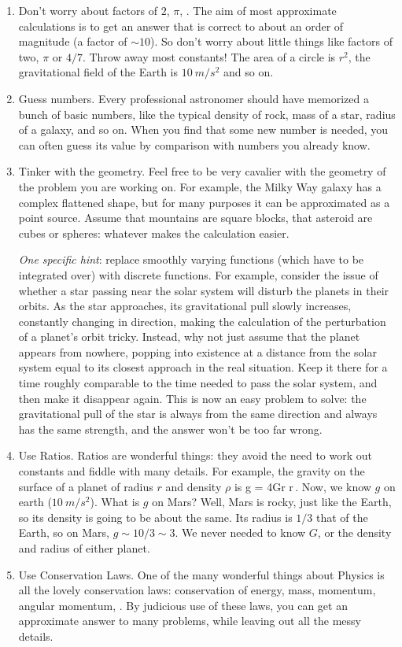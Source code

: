 \begin{enumerate}
\item Don't worry about factors of $2$, $\pi$, \etc. The aim of most approximate calculations is to get an answer that is correct to about an order of magnitude (a factor of $\sim 10$). So don't worry about little things like factors of two, $\pi$ or $4/7$. Throw away most constants! The area of a circle is $r^2$, the gravitational field of the Earth is $\SI{10}{m/s^2}$ and so on.
%
\item Guess numbers. Every professional astronomer should have memorized a bunch of basic numbers, like the typical density of rock, mass of a star, radius of a galaxy, and so on. When you find that some new number is needed, you can often guess its value by comparison with numbers you already know.
%
\item Tinker with the geometry.  Feel free to be very cavalier with the geometry of the problem you are working on. For example, the Milky Way galaxy has a complex flattened shape, but for many purposes it can be approximated as a point source. Assume that mountains are square blocks, that asteroid are cubes or spheres: whatever makes the calculation easier.

\emph{One specific hint}: replace smoothly varying functions (which have to be integrated over) with discrete functions. For example, consider the issue of whether a star passing near the solar system will disturb the planets in their orbits. As the star approaches, its gravitational pull slowly increases, constantly changing in direction, making the calculation of the perturbation of a planet's orbit tricky. Instead, why not just assume that the planet appears from nowhere, popping into existence at a distance from the solar system equal to its closest approach in the real situation. Keep it there for a time roughly comparable to the time needed to pass the solar system, and then make it disappear again. This is now an easy problem to solve: the gravitational pull of the star is always from the same direction and always has the same strength, and the answer won't be too far wrong.
%
\item Use Ratios. Ratios are wonderful things: they avoid the need to work out constants and fiddle with many details. For example, the gravity on the surface of a planet of radius $r$ and density $\rho$ is
\beq
g = 4G\pi r \rho \propto r\rho\,.
\eeq
Now, we know $g$ on earth ($\SI{10}{m/s^2}$). What is $g$ on Mars? Well, Mars is rocky, just like the Earth, so its density is going to be about the same. Its radius is $1/3$ that of the Earth, so on Mars, $g \sim 10/3 \sim 3$. We never needed to know $G$, or the density and radius of either planet.
%
\item Use Conservation Laws. One of the many wonderful things about Physics is all the lovely conservation laws: conservation of energy, mass, momentum, angular momentum, \etc. By judicious use of these laws, you can get an approximate answer to many problems, while leaving out all the messy details.


\end{enumerate}
